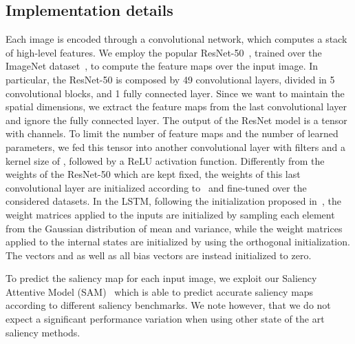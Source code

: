 \subsection{Implementation details}
Each image is encoded through a convolutional network, which computes a stack of high-level features. We employ the popular ResNet-50~\cite{he2015deep}, trained over the ImageNet dataset~\cite{russakovsky2015imagenet}, to compute the feature maps over the input image. In particular, the ResNet-50 is composed by 49 convolutional layers, divided in 5 convolutional blocks, and 1 fully connected layer. Since we want to maintain the spatial dimensions, we extract the feature maps from the last convolutional layer and ignore the fully connected layer. The output of the ResNet model is a tensor with  channels. To limit the number of feature maps and the number of learned parameters, we fed this tensor into another convolutional layer with  filters and a kernel size of , followed by a ReLU activation function. Differently from the weights of the ResNet-50 which are kept fixed, the weights of this last convolutional layer are initialized according to~\cite{glorot2010understanding} and fine-tuned over the considered datasets. In the LSTM, following the initialization proposed in~\cite{bahdanau2014neural}, the weight matrices applied to the inputs are initialized by sampling each element from the Gaussian distribution of  mean and  variance, while the weight matrices applied to the internal states are initialized by using the orthogonal initialization. The vectors  and  as well as all bias vectors  are instead initialized to zero. 


To predict the saliency map for each input image, we exploit our Saliency Attentive Model (SAM)~\cite{cornia2017sam} which is able to predict accurate saliency maps according to different saliency benchmarks. We note however, that we do not expect a significant performance variation when using other state of the art saliency methods.

